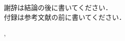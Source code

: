 \documentclass[a4paper]{jarticle}
\begin{document}
 謝辞は結論の後に書いてください．\\

 付録は参考文献の前に書いてください．

\cite{koeuranai},\cite{110008001037}
% 


\end{document}
